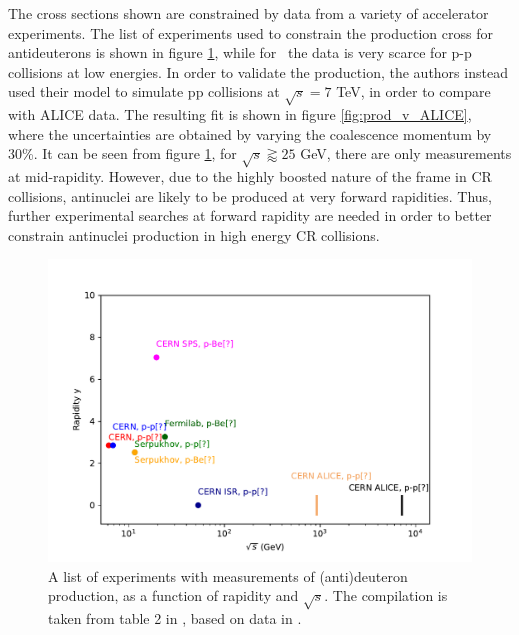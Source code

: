 The cross sections shown are constrained by data from a variety of accelerator experiments. The list of experiments used to constrain the production cross for antideuterons is shown in figure \ref{fig:dbar_prod_v_rapidity}, while for \ahe\ the data is very scarce for p-p collisions at low energies. In order to validate the production, the authors instead used their model to simulate pp collisions at $\sqrt{s}=7$ TeV, in order to compare with ALICE data. The resulting fit is shown in figure \ref{fig:prod_v_ALICE}, where the uncertainties are obtained by varying the coalescence momentum by 30\%. It can be seen from figure \ref{fig:dbar_prod_v_rapidity}, for $\sqrt{s} \gtrapprox 25$ GeV, there are only measurements at mid-rapidity. However, due to the highly boosted nature of the frame in CR collisions, antinuclei are likely to be produced at very forward rapidities. Thus, further experimental searches at forward rapidity are needed in order to better constrain antinuclei production in high energy CR collisions.  

\begin{figure}
    \centering
    \includegraphics[width=\textwidth]{figures/dbar_production_experiments_sqrts_v_rapidity.pdf}
    \caption{A list of experiments with measurements of (anti)deuteron production, as a function of rapidity and $\sqrt{s}$. The compilation is taken from table 2 in \cite{Gomez_Coral_2018}, based on data in \cite{Diego24, Diego28, Diego31, Diego34, Diego50, Diego51, Diego52, Diego53, Diego54, Diego55, Diego56}.}
    \label{fig:dbar_prod_v_rapidity}
\end{figure}

